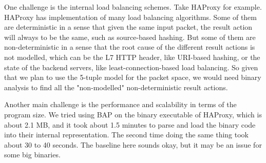 One challenge is the internal load balancing schemes. Take HAProxy for example.
HAProxy has implementation of many load balancing algorithms. Some of them are
deterministic in a sense that given the same input packet, the result action
will always to be the same, such as source-based hashing. But some of them are
non-deterministic in a sense that the root cause of the different result actions
is not modelled, which can be the L7 HTTP header, like URI-based hashing, or the
state of the backend servers, like least-connection-based load balancing. So
given that we plan to use the 5-tuple model for the packet space, we would need
binary analysis to find all the "non-modelled" non-deterministic result actions.

Another main challenge is the performance and scalability in terms of the
program size. We tried using BAP on the binary executable of HAProxy, which is
about 2.1 MB, and it took about 1.5 minutes to parse and load the binary code
into their internal representation. The second time doing the same thing took
about 30 to 40 seconds. The baseline here sounds okay, but it may be an issue
for some big binaries.







%
%



